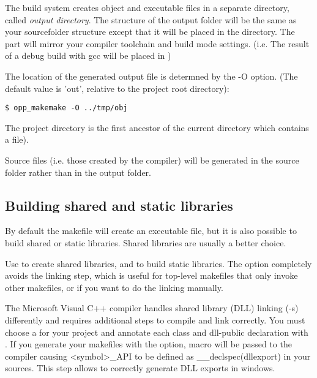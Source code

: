 The build system creates object and executable files in a separate directory, called 
\textit{output directory}. The structure of the output folder will be the same as your 
sourcefolder structure except that it will be placed in the  directory.
The  part will mirror your compiler toolchain and build mode settings. 
(i.e. The result of a debug build with gcc will be placed in )


The location of the generated output file is determned by the -O option.
(The default value is 'out', relative to the project root directory):


\begin{verbatim}
$ opp_makemake -O ../tmp/obj
\end{verbatim}


\begin{note}
The project directory is the first ancestor of the current directory which
contains a  file).
\end{note}


\begin{note}
Source files (i.e. those created by the  compiler) will be generated in the 
source folder rather than in the output folder.
\end{note}


\subsection{Building shared and static libraries}

By default the makefile will create an executable file, but it is also
possible to build shared or static libraries. Shared libraries
are usually a better choice.

Use  to create shared libraries, and 
to build static libraries. The  option completely avoids
the linking step, which is useful for top-level makefiles that only invoke
other makefiles, or if you want to do the linking manually.

\ifcommercial
\begin{note}
The Microsoft Visual C++ compiler handles shared library (DLL) linking (-s)
differently and requires additional steps to compile and link correctly. 
You must choose a  for your project and annotate each class 
and dll-public declaration with . If you generate your makefiles
with the  option,  macro will be passed to 
the compiler causing <symbol>_API to be defined as __declspec(dllexport) in 
your sources. This step allows to correctly generate DLL exports in windows.
\end{note}
\fi


